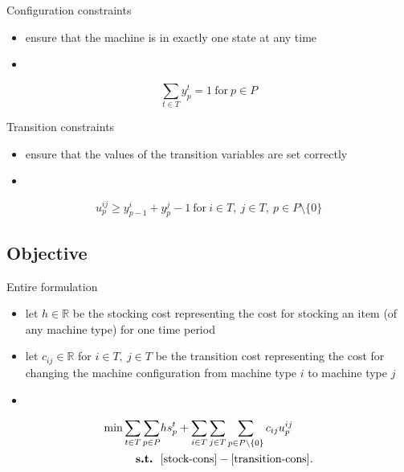 \documentclass{beamer}
\begin{document}
  \begin{frame}{Configuration constraints}
    \begin{itemize}
      \item ensure that the machine is in exactly one state at any
        time
      \item[]
    \end{itemize}
    \begin{equation}\sum\limits_{t \in T} y^t_p = 1~\text{for}~p \in P\label{config-cons}\end{equation}
  \end{frame}

  \begin{frame}{Transition constraints}
    \begin{itemize}
    \item ensure that the values of the transition variables are set
      correctly 
    \item[]
    \end{itemize}
    \begin{equation}u^{ij}_p \geq y^i_{p-1} + y^j_p -1~\text{for}~i \in T,~j \in T,~p \in P \setminus \{0\}\label{transition-cons}\end{equation}
  \end{frame}

  \subsection{Objective}
  \begin{frame}{Entire formulation}
    \begin{itemize}
      \item let $h \in \mathbb{R}$ be the stocking cost representing
        the cost for stocking an item (of any machine type) for one
        time period
      \item let $c_{ij} \in \mathbb{R}$ for $i \in T,~j \in T$ be the
        transition cost representing the cost for changing the machine
        configuration from machine type $i$ to machine type $j$
      \item[]
    \end{itemize}
    \begin{align*}\min \sum\limits_{t \in T} \sum\limits_{p \in P} &h s^t_p + \sum\limits_{i \in T} \sum\limits_{j \in T} \sum\limits_{p \in P \setminus \{0\}} c_{ij} u^{ij}_p\\
      \textbf{s.t.}~~&\eqref{stock-cons} - \eqref{transition-cons}.
    \end{align*}
  \end{frame}
    
\end{document}
